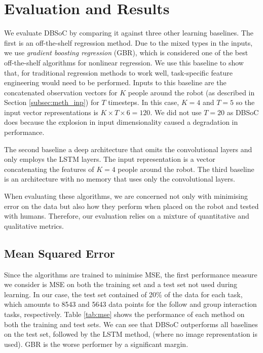 \documentclass[letterpaper, 10 pt, conference]{ieeeconf}
\begin{document}
\section{Evaluation and Results}
We evaluate DBSoC by comparing it against three other learning baselines. The first is an off-the-shelf regression method. Due to the mixed types in the inputs, we use \emph{gradient boosting regression} (GBR), which  is considered one of the best off-the-shelf algorithms for nonlinear regression. We use this baseline to show that, for traditional regression methods to work well, task-specific feature engineering would need to be performed. Inputs to this baseline are the concatenated observation vectors for $K$ people around the robot (as described in Section \ref{subsec:meth_inp}) for $T$ timesteps. In this case, $K=4$ and $T =5$ so the input vector representations is $K\times T \times 6 = 120$. We did not use $T=20$ as DBSoC does because the explosion in input dimensionality caused a degradation in performance. 

The second baseline a deep architecture that omits the convolutional layers and only employs the LSTM layers. The input representation is a vector concatenating the features of $K=4$ people around the robot. The third baseline is an architecture with no memory that uses only the convolutional layers.

When evaluating these algorithms, we are concerned not only with minimising error on the data but also how they perform when placed on the robot and tested with humans. Therefore, our evaluation relies on a mixture of quantitative and qualitative metrics. 

\subsection{Mean Squared Error}
Since the algorithms are trained to minimise MSE, the first performance measure we consider is MSE on both the training set and a test set not used during learning. In our case, the test set contained of 20\% of the data for each task, which amounts to 8543 and 5643 data points for the follow and group interaction tasks, respectively. Table \ref{tab:mse} shows the performance of each method on both the training and test sets. We can see that DBSoC outperforms all baselines on the test set, followed by the LSTM method, (where no image representation is used). GBR is the worse performer by a significant margin.

\end{document}
